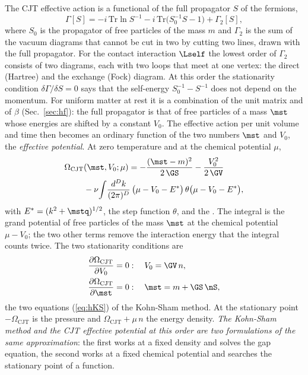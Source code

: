 The CJT effective action is a functional of the full propagator $S$ of the fermions,
\begin{equation}
\Gamma[S]=-i\,\mathrm{Tr}\ln S^{-1}-i\,\mathrm{Tr}\big(S_0^{-1}S-1\big)+\Gamma_2[S],
\label{eq:GammaCJT}
\end{equation}
where $S_0$ is the propagator of free particles of the mass $m$ and $\Gamma_2$ is the sum of the
vacuum diagrams that cannot be cut in two by cutting two lines, drawn with the full propagator. For
the contact interaction $\Lself$ the lowest order of $\Gamma_2$ consists of two diagrams, each with
two loops that meet at one vertex: the direct (Hartree) and the exchange (Fock) diagram. At this
order the stationarity condition $\delta\Gamma/\delta S=0$ says that the self-energy
$S_0^{-1}-S^{-1}$ does not depend on the momentum. For uniform matter at rest it is a combination of
the unit matrix and of $\beta$ (Sec.~\ref{sec:hf}): the full propagator is that of free particles of
a mass $\mst$ whose energies are shifted by a constant $V_0$. The effective action per unit volume
and time then becomes an ordinary function of the two numbers $\mst$ and $V_0$, the \emph{effective
potential}. At zero temperature and at the chemical potential $\mu$,
\begin{align}
\Omega_{\mathrm{CJT}}&(\mst,V_0;\mu)=-\frac{(\mst-m)^{2}}{2\,\GS}-\frac{V_0^{2}}{2\,\GV}\nonumber\\
&-\nu\!\int\!\frac{d^{D}k}{(2\pi)^{D}}\,\big(\mu-V_0-E^{*}\big)\,\theta\big(\mu-V_0-E^{*}\big),
\label{eq:OmegaCJT}
\end{align}
with $E^{*}=(k^{2}+\mstq)^{1/2}$, the step function $\theta$, and the . The integral is the grand potential of free particles of the mass $\mst$ at
the chemical potential $\mu-V_0$; the two other terms remove the interaction energy that the
integral counts twice. The two stationarity conditions are
\begin{equation}
\begin{aligned}
\frac{\partial\Omega_{\mathrm{CJT}}}{\partial V_0}&=0:\quad V_0=\GV\,n,\\
\frac{\partial\Omega_{\mathrm{CJT}}}{\partial\mst}&=0:\quad\mst=m+\GS\,\nS ,
\end{aligned}
\label{eq:CJTstat}
\end{equation}
the two equations (\ref{eq:hKS}) of the Kohn-Sham method. At the stationary point
$-\Omega_{\mathrm{CJT}}$ is the pressure and $\Omega_{\mathrm{CJT}}+\mu\,n$ the energy density.
\emph{The Kohn-Sham method and the CJT effective potential at this order are two formulations of the
same approximation}: the first works at a fixed density and solves the gap equation, the second
works at a fixed chemical potential and searches the stationary point of a function.

